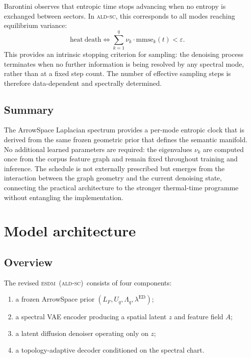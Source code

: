 \documentclass[11pt]{article}
\newcommand{\ESDM}{\textsc{esdm}}
\newcommand{\ALDSC}{\textsc{ald-sc}}
\newcommand{\Lf}{L_F}
\newcommand{\Uq}{U_q}
\newcommand{\Lq}{\Lambda_q}
\newcommand{\ed}{\lambda^{\mathrm{ED}}}
\begin{document}
Barontini observes that entropic time stops advancing when no entropy is
exchanged between sectors. In \ALDSC, this corresponds to all modes reaching
equilibrium variance:
\[\mathrm{heat\ death} \iff \sum_{k=1}^{q} \nu_k \cdot \mathrm{mmse}_k(t) < \varepsilon.\]
This provides an intrinsic stopping criterion for sampling: the denoising
process terminates when no further information is being resolved by any
spectral mode, rather than at a fixed step count. The number of effective
sampling steps is therefore data-dependent and spectrally determined.

\subsection{Summary}
\label{sec:clock_summary}

The ArrowSpace Laplacian spectrum provides a per-mode entropic clock that is
derived from the same frozen geometric prior that defines the semantic
manifold. No additional learned parameters are required: the eigenvalues
\(\nu_k\) are computed once from the corpus feature graph and remain fixed
throughout training and inference. The schedule is not externally prescribed
but emerges from the interaction between the graph geometry and the current
denoising state, connecting the practical architecture to the stronger
thermal-time programme without entangling the implementation.



\section{Model architecture}
\label{sec:model}

\subsection{Overview}
\label{sec:overview}

The revised \ESDM~(\ALDSC)~consists of four components:

\begin{enumerate}[leftmargin=1.5em]
\item a frozen ArrowSpace prior $(\Lf,\Uq,\Lq,\ed)$;
\item a spectral VAE encoder producing a spatial latent $z$ and feature field $A$;
\item a latent diffusion denoiser operating only on $z$;
\item a topology-adaptive decoder conditioned on the spectral chart.
\end{enumerate}
\end{document}
